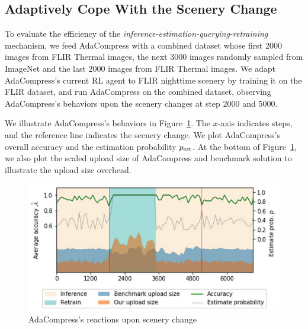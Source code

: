 \subsection{Adaptively Cope With the Scenery Change}

To evaluate the efficiency of the \emph{inference-estimation-querying-retraining} mechanism, we feed AdaCompress with a combined dataset whose first 2000 images from FLIR Thermal images, the next 3000 images randomly sampled from ImageNet and the last 2000 images from FLIR Thermal images. We adapt AdaCompress's current RL agent to FLIR nighttime scenery by training it on the FLIR dataset, and run AdaCompress on the combined dataset, observing AdaCompress's behaviors upon the scenery changes at step 2000 and 5000. %

We illustrate AdaCompress's behaviors in Figure~\ref{fig: running-retrain}. The $ x $-axis indicates steps, and the reference line indicates the scenery change. We plot AdaCompress's overall accuracy and the estimation probability $ p_{\rm est} $. At the bottom of Figure~\ref{fig: running-retrain}, we also plot the scaled upload size of AdaCompress and benchmark solution to illustrate the upload size overhead.

\begin{figure}[!t]
	\includegraphics[width=0.8\linewidth]{figures/running-retrain.pdf}
	\caption{AdaCompress's reactions upon scenery change}
	\label{fig: running-retrain}
\vspace{-0.1cm} 
\end{figure}

